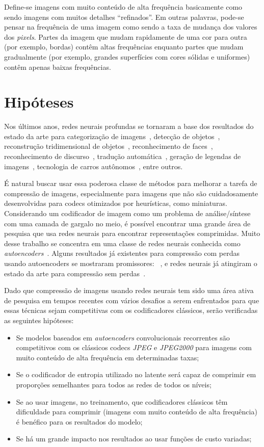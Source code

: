 Define-se imagens com muito conteúdo de alta frequência basicamente como sendo imagens com muitos detalhes ``refinados''. Em outras palavras, pode-se pensar na frequência de uma imagem como sendo a taxa de mudança dos valores dos \textit{pixels}. Partes da imagem que mudam rapidamente de uma cor para outra (por exemplo, bordas) contêm altas frequências enquanto partes que mudam gradualmente (por exemplo, grandes superfícies com cores sólidas e uniformes) contêm apenas baixas frequências.
\section{Hipóteses}
\label{sec:hipotese}
Nos últimos anos, redes neurais profundas se tornaram a base dos resultados do estado da arte para categorização de imagens~\cite{simonyan}, detecção de objetos~\cite{girshick2014rich}, reconstrução tridimensional de objetos~\cite{choy20163d}, reconhecimento de faces~\cite{deepface}, reconhecimento de discurso~\cite{graves}, tradução automática~\cite{sequence}, geração de legendas de imagens~\cite{vinyals2015show}, tecnologia de carros autônomos~\cite{huval2015empirical}, entre outros. 

É natural buscar usar essa poderosa classe de métodos para melhorar a tarefa de compressão de imagens, especialmente para imagens que não são cuidadosamente desenvolvidas para codecs otimizados por heurísticas, como miniaturas. Considerando um codificador de imagem como um problema de análise/síntese com uma camada de gargalo no meio, é possível encontrar uma grande área de pesquisa que usa redes neurais para encontrar representações comprimidas. Muito desse trabalho se concentra em uma classe de redes neurais conhecida como \emph{autoencoders}~\cite{autoencoder2011}. Alguns resultados já existentes para compressão com perdas usando autoencoders se mostraram promissores: ~\cite{gregor2016, toderici2017, toderici2016}, e redes neurais já atingiram o estado da arte para compressão sem perdas~\cite{mentzer2019, theis2015generative}. 

Dado que compressão de imagens usando redes neurais tem sido uma área ativa de pesquisa em tempos recentes com vários desafios a serem enfrentados para que essas técnicas sejam competitivas com os codificadores clássicos, serão verificadas as seguintes hipóteses:
\begin{itemize}
    \item Se modelos baseados em \textit{autoencoders} convolucionais recorrentes são competitivos com os clássicos codecs \textit{JPEG} e \textit{JPEG2000} para imagens com muito conteúdo de alta frequência em determinadas taxas;
    \item Se o codificador de entropia utilizado no latente será capaz de comprimir em proporções semelhantes para todos as redes de todos os níveis;
    \item Se ao usar imagens, no treinamento, que codificadores clássicos têm dificuldade para comprimir (imagens com muito conteúdo de alta frequência) é benéfico para os resultados do modelo;
    \item Se há um grande impacto nos resultados ao usar funções de custo variadas;
\end{itemize}

